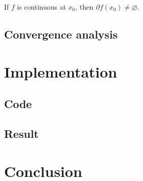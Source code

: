 \documentclass[11pt]{article}
\begin{document}
\begin{remark}
    If \(f\) is continuous at \(x_0\), then \(\partial f(x_0) \neq \varnothing\).
\end{remark}

\subsection{Convergence analysis}

\section{Implementation}

\subsection{Code}

\subsection{Result}

\section{Conclusion}




\end{document}
